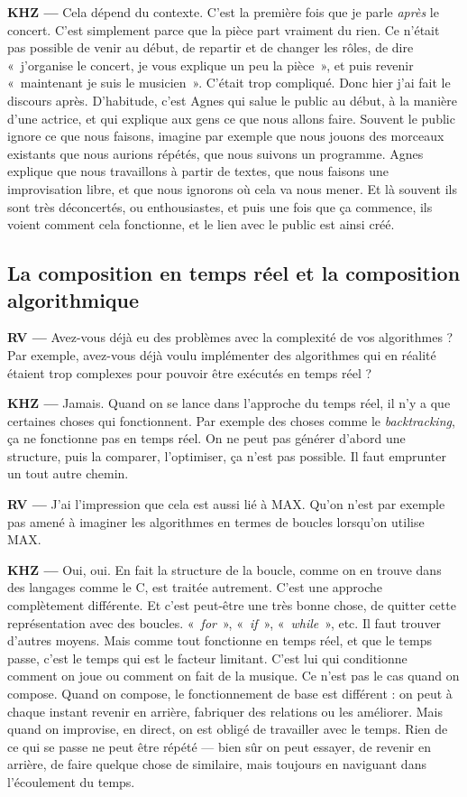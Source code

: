 \documentclass[a4paper,12pt]{article}
\newcommand{\guill}[1]{«~#1~»}
\begin{document}
\textbf{KHZ ---} Cela dépend du contexte. C'est la première fois que je parle \emph{après} le concert. C'est simplement parce que la pièce part vraiment du rien. Ce n'était pas possible de venir au début, de repartir et de changer les rôles, de dire \guill{j'organise le concert, je vous explique un peu la pièce}, et puis revenir \guill{maintenant je suis le musicien}. C'était trop compliqué. Donc hier j'ai fait le discours après. D'habitude, c'est Agnes qui salue le public au début, à la manière d'une actrice, et qui explique aux gens ce que nous allons faire. Souvent le public ignore ce que nous faisons, imagine par exemple que nous jouons des morceaux existants que nous aurions répétés, que nous suivons un programme. Agnes explique que nous travaillons à partir de textes, que nous faisons une improvisation libre, et que nous ignorons où cela va nous mener. Et là souvent ils sont très déconcertés, ou enthousiastes, et puis une fois que ça commence, ils voient comment cela fonctionne, et le lien avec le public est ainsi créé.

\subsection{La composition en temps réel et la composition algorithmique}

\textbf{RV ---} Avez-vous déjà eu des problèmes avec la complexité de vos algorithmes ? Par exemple, avez-vous déjà voulu implémenter des algorithmes qui en réalité étaient trop complexes pour pouvoir être exécutés en temps réel ?

\textbf{KHZ ---} Jamais. Quand on se lance dans l'approche du temps réel, il n'y a que certaines choses qui fonctionnent. Par exemple des choses comme le \emph{backtracking}, ça ne fonctionne pas en temps réel. On ne peut pas générer d'abord une structure, puis la comparer, l'optimiser, ça n'est pas possible. Il faut emprunter un tout autre chemin.

\textbf{RV ---} J'ai l'impression que cela est aussi lié à MAX. Qu'on n'est par exemple pas amené à imaginer les algorithmes en termes de boucles lorsqu'on utilise MAX.

\textbf{KHZ ---} Oui, oui. En fait la structure de la boucle, comme on en trouve dans des langages comme le C, est traitée autrement. C'est une approche complètement différente. Et c'est peut-être une très bonne chose, de quitter cette représentation avec des boucles. \guill{\emph{for}}, \guill{\emph{if}}, \guill{\emph{while}}, etc. Il faut trouver d'autres moyens. Mais comme tout fonctionne en temps réel, et que le temps passe, c'est le temps qui est le facteur limitant. C'est lui qui conditionne comment on joue ou comment on fait de la musique. Ce n'est pas le cas quand on compose. Quand on compose, le fonctionnement de base est différent : on peut à chaque instant revenir en arrière, fabriquer des relations ou les améliorer. Mais quand on improvise, en direct, on est obligé de travailler avec le temps. Rien de ce qui se passe ne peut être répété --- bien sûr on peut essayer, de revenir en arrière, de faire quelque chose de similaire, mais toujours en naviguant dans l'écoulement du temps.
\end{document}
